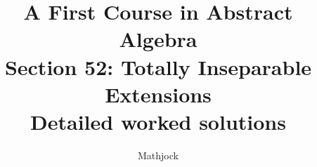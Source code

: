 
\title{\textbf{A First Course in Abstract Algebra}\\[0.3em]Section 52: Totally Inseparable Extensions\\[0.3em]\large Detailed worked solutions}
\author{Mathjock}
\date{}

\maketitle
\bookinfo
\tableofcontents
\clearpage
\renewcommand{\thesection}{52}
\renewcommand{\theHsection}{fraleigh.52}


